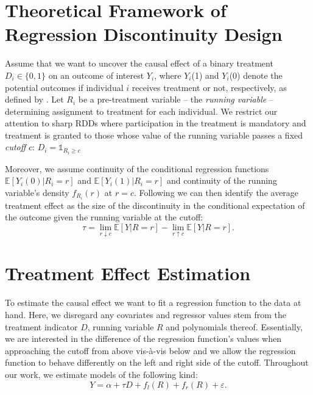\documentclass[11pt, a4paper, leqno]{article}
\numberwithin{equation}{section}
\numberwithin{figure}{section}
\numberwithin{table}{section}
\numberwithin{algorithm}{section}
\begin{document}
\section{Theoretical Framework of Regression Discontinuity Design} %
\label{sec:framework}

Assume that we want to uncover the causal effect of a binary treatment $ D_{i} \in \lbrace 0,1 \rbrace $ on an outcome of interest $Y_{i}$, where $Y_{i}$(1) and $Y_{i}$(0) denote the potential outcomes if individual $i$ receives treatment or not, respectively, as defined by \cite{rubin}. Let $R_{i}$ be a pre-treatment variable -- the \textit{running variable} -- determining assignment to treatment for each individual. We restrict our attention to sharp RDDs where participation in the treatment is mandatory and treatment is granted to those whose value of the running variable passes a fixed \textit{cutoff} $c$: $D_{i} = \mathds{1}_{R_{i} \geq c}$

Moreover, we assume continuity of the conditional regression functions $\mathbb{E}\left[Y_{i}(0) \vert R_{i} = r\right]$ and  $\mathbb{E}\left[Y_{i}(1) \vert R_{i} = r\right]$ and continuity of the running variable's density $f_{R_{i}}(r)$ at $r=c$. Following \cite{hahn_et_al} we can then identify the average treatment effect as the size of the discontinuity in the conditional expectation of the outcome given the running variable at the cutoff:
\begin{equation}
\tau = \lim_{r \downarrow c} \mathbb{E}\left[Y \vert R = r\right] - \lim_{r \uparrow c} \mathbb{E}\left[ Y \vert R = r\right].
\label{eq: ident_ass}
\end{equation}



\section{Treatment Effect Estimation} %
\label{sec: estim}

To estimate the causal effect we want to fit a regression function to the data at hand. Here, we disregard any covariates and regressor values stem from the treatment indicator $D$, running variable $R$ and polynomials thereof. Essentially, we are interested in the difference of the regression function's values when approaching the cutoff from above vis-à-vis below and we allow the regression function to behave differently on the left and right side of the cutoff. Throughout our work, we estimate models of the following kind:
\begin{equation}
Y = \alpha + \tau D + f_{l}(R) + f_{r}(R) + \varepsilon .
\label{eq: model_general}
\end{equation}
\end{document}
